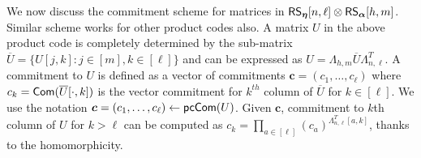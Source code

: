 We now discuss the commitment scheme for matrices in $\mathsf{RS}_{\bm{\eta}}[n,\ell] \otimes \mathsf{RS}_{\bm{\alpha}}[h,m]$. Similar scheme works for other product codes also. 
A matrix $U$ in the above product code is
completely determined by the sub-matrix $\overline{U}=\{U[j,k]: j\in [m], k\in [\ell]\}$ and can be expressed as $U=\Lambda_{h,m}\overline{U}\Lambda_{n,\ell}^T$. 
A commitment to $U$ is defined as  a vector of commitments $\bm{c}=(c_1,\ldots,c_\ell)$
where $c_k=\mathsf{Com}(\overline{U}[\cdot,k])$ is the vector commitment for $k^{th}$
column of $\overline{U}$ for $k\in [\ell]$. We use the notation $\bm{c} = (c_1,\ldots,c_\ell) \gets \mathsf{pcCom}(U)$. Given $\bm{c}$, commitment to $k$th column of $U$ for $k > \ell$ 
can be computed as  $c_k=\prod_{a\in [\ell]}(c_a)^{\Lambda_{n,\ell}^T[a,k]}$, thanks to the homomorphicity.



